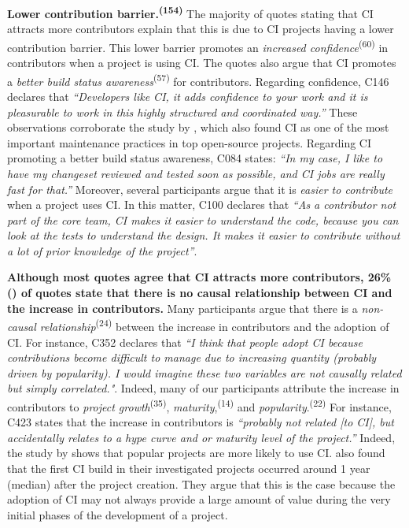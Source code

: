 \vspace{1mm}
\noindent\textbf{Lower contribution barrier.\textsuperscript{(154)}}
The majority of quotes stating that CI attracts more contributors explain that this is due to CI projects having a lower contribution barrier. This lower barrier promotes an \textit{increased confidence}\textsuperscript{(60)} in contributors when a project is using CI. The quotes also argue that CI promotes a \textit{better build status awareness}\textsuperscript{(57)} for contributors. Regarding confidence, 
C146 declares that \textit{``Developers like CI, it adds confidence to your work and it is pleasurable to work in this highly structured and coordinated way.''} These observations corroborate the study by \cite{coelho2017modern}, which also found CI as one of the most important maintenance practices in top open-source projects.	
Regarding CI promoting a better build status awareness, C084 states: \textit{``In my case, I like to have my changeset reviewed and tested soon as possible, and CI jobs are really fast for that.''} 
Moreover, several participants argue that it is \textit{easier to contribute} when a project uses CI. In this matter, 
C100 declares that \textit{``As a contributor not part of the core team, CI makes it easier to understand the code, because you can look at the tests to understand the design. It makes it easier to contribute without a lot of prior knowledge of the project''}.

\vspace{1mm}
\noindent\textbf{Although most quotes agree that CI attracts more contributors, 26\% () of quotes state that there is no causal relationship between CI and the increase in contributors.} Many participants argue that there is a \textit{non-causal relationship}\textsuperscript{(24)} between the increase in contributors and the adoption of CI. For instance, C352 declares that \textit{``I think that people adopt CI because contributions become difficult to manage due to increasing quantity (probably driven by popularity). I would imagine these two variables are not causally related but simply correlated."}.
Indeed, many of our participants attribute the increase in contributors to \textit{project growth}\textsuperscript{(35)}, \textit{maturity},\textsuperscript{(14)} and \textit{popularity}.\textsuperscript{(22)} 
For instance, C423 states that the increase in contributors is \textit{``probably not related [to CI], but accidentally relates to a hype curve and or maturity level of the project.''} Indeed, the study by \cite{Hilton2016-xy} shows that popular projects are more likely to use CI. \cite{Hilton2016-xy} also found that the first CI build in their investigated projects occurred around 1 year (median) after the project creation. They argue that this is the case because the adoption of CI may not always provide a large amount of value during the very initial phases of the development of a project.


